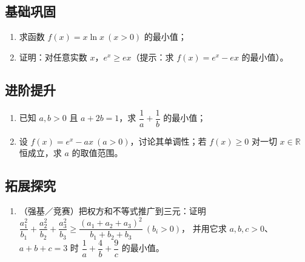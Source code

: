 \begin{afterclass}
\subsection*{基础巩固}
\begin{enumerate}
  \item 求函数 $f(x)=x\ln x\ (x>0)$ 的最小值；
  \item 证明：对任意实数 $x$，$e^x\ge ex$（提示：求 $f(x)=e^x-ex$ 的最小值）。
\end{enumerate}

\subsection*{进阶提升}
\begin{enumerate}
  \item 已知 $a,b>0$ 且 $a+2b=1$，求 $\dfrac1a+\dfrac1b$ 的最小值；
  \item 设 $f(x)=e^x-ax\ (a>0)$，讨论其单调性；若 $f(x)\ge0$ 对一切 $x\in\mathbb R$ 恒成立，求 $a$ 的取值范围。
\end{enumerate}

\subsection*{拓展探究}
\begin{enumerate}
  \item （强基／竞赛）把权方和不等式推广到三元：证明
  $\dfrac{a_1^2}{b_1}+\dfrac{a_2^2}{b_2}+\dfrac{a_3^2}{b_3}\ge\dfrac{(a_1+a_2+a_3)^2}{b_1+b_2+b_3}\ (b_i>0)$，
  并用它求 $a,b,c>0$、$a+b+c=3$ 时 $\dfrac1a+\dfrac4b+\dfrac9c$ 的最小值。
\end{enumerate}


\end{afterclass}

